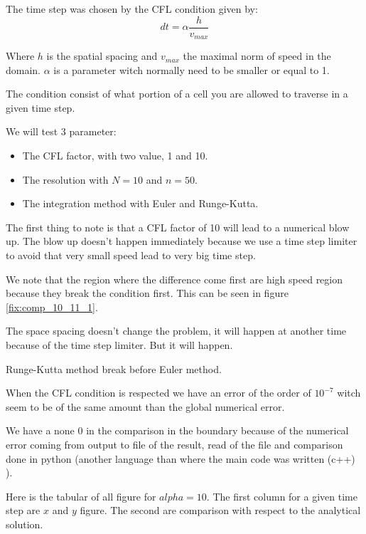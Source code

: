 The time step was chosen by the CFL condition given by:
\begin{equation}
  dt=\alpha \frac{h}{v_{max}}
\end{equation}

Where $h$ is the spatial spacing and $v_{max}$ the maximal norm of speed in the domain.
$\alpha$ is a parameter witch normally need to be smaller or equal to 1.

The condition consist of what portion of a cell you are allowed to traverse in a given time step.

We will test 3 parameter:
\begin{itemize}
	\item The CFL factor, with two value, 1 and 10.
	\item The resolution with $N=10$ and $n=50$.
	\item The integration method with Euler and Runge-Kutta.
\end{itemize}
 
The first thing to note is that a CFL factor of 10 will lead to a numerical blow up.
The blow up doesn't happen immediately because we use a time step limiter to avoid that very small speed lead to very big time step.

We note that the region where the difference come first are high speed region because they break the condition first.
This can be seen in figure \ref{fix:comp_10_11_1}.

The space spacing doesn't change the problem, it will happen at another time because of the time step limiter.
But it will happen.

Runge-Kutta method break before Euler method.

When the CFL condition is respected we have an error of the order of $10^{-7}$ witch seem to be of the same amount than the global numerical error.

We have a none 0 in the comparison in the boundary because of the numerical error coming from output to file of the result,
read of the file and comparison done in python (another language than where the main code was written (c++) ).

Here is the tabular of all figure for $alpha=10$. The first column for a given time step are $x$ and $y$ figure.
The second are comparison with respect to the analytical solution.

